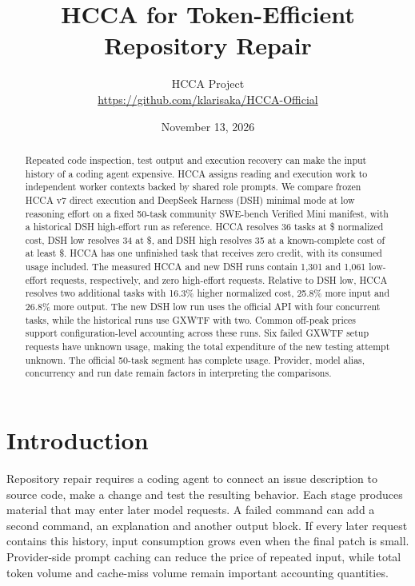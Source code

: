 \documentclass[10pt,a4paper]{article}
\title{\textbf{HCCA for Token-Efficient\\Repository Repair}}
\author{HCCA Project\\\small\url{https://github.com/klarisaka/HCCA-Official}}
\date{November 13, 2026}
\begin{document}
\maketitle
\thispagestyle{plain}

\begin{abstract}
Repeated code inspection, test output and execution recovery can make the input
history of a coding agent expensive. HCCA assigns reading and execution work to
independent worker contexts backed by shared role prompts. We compare frozen
HCCA v7 direct execution and DeepSeek Harness (DSH) minimal mode at low reasoning
effort on a fixed 50-task community SWE-bench Verified Mini manifest, with a
historical DSH high-effort run as reference. HCCA resolves 36 tasks at
\$\HCost{} normalized cost, DSH low resolves 34 at \$\LCost{}, and DSH high
resolves 35 at a known-complete cost of at least \$\BCost{}. HCCA has one
unfinished task that receives zero credit, with its consumed usage included.
The measured HCCA and new DSH runs contain 1,301 and 1,061 low-effort requests,
respectively, and zero high-effort requests. Relative to DSH low, HCCA resolves
two additional tasks with 16.3\% higher normalized cost, 25.8\% more input and
26.8\% more output. The new DSH low run uses the official API with four
concurrent tasks, while the historical runs use GXWTF with two. Common off-peak
prices support configuration-level accounting across these runs. Six failed
GXWTF setup requests have unknown usage, making the total expenditure of the
new testing attempt unknown. The official 50-task segment has complete usage.
Provider, model alias, concurrency and run date remain factors in interpreting
the comparisons.
\end{abstract}

\section{Introduction}

Repository repair requires a coding agent to connect an issue description to
source code, make a change and test the resulting behavior. Each stage produces
material that may enter later model requests. A failed command can add a second
command, an explanation and another output block. If every later request
contains this history, input consumption grows even when the final patch is
small. Provider-side prompt caching can reduce the price of repeated input,
while total token volume and cache-miss volume remain important accounting
quantities.
\end{document}
